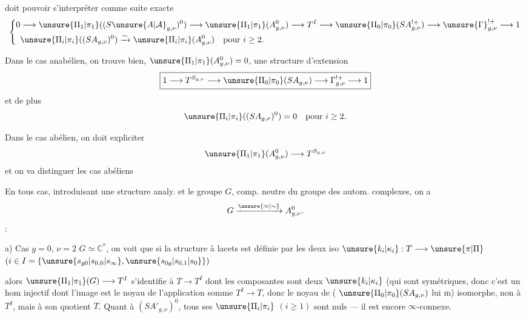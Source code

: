 

doit pouvoir s'interpréter comme suite exacte
\[
\left\{\begin{aligned}
0&\longrightarrow\unsure{\Pi_1|\pi_1}((S\unsure{A|\mathcal A}_{g,\nu})^0)
\longrightarrow\unsure{\Pi_1|\pi_1}(A_{g,\nu}^0)
\longrightarrow T^I\longrightarrow\unsure{\Pi_0|\pi_0}(SA_{g,\nu}^{!+})
\longrightarrow\unsure{\Gamma}_{g,\nu}^{!+}\longrightarrow1\\
&\unsure{\Pi_i|\pi_i}((SA_{g,\nu})^0)\xrightarrow{\sim}
\unsure{\Pi_i|\pi_i}(A_{g,\nu}^0)\quad\text{pour }i\geq2.
\end{aligned}\right.
\]

Dans le cas anabélien, on trouve bien, 
$\unsure{\Pi_1|\pi_1}(A_{g,\nu}^0)=0$, une structure d'extension
\[
\boxed{1\longrightarrow T^{S_{g,\nu}}\longrightarrow
\unsure{\Pi_0|\pi_0}(SA_{g,\nu})\longrightarrow\Gamma_{g,\nu}^{!+}\longrightarrow1}
\]
et de plus
\[
\unsure{\Pi_i|\pi_i}((SA_{g,\nu})^0)=0\quad\text{pour }i\geq2.
\]

Dans le cas abélien, on doit expliciter
\[
\unsure{\Pi_1|\pi_1}(A_{g,\nu}^0)\longrightarrow T^{S_{g,\nu}}
\]
et on va distinguer les  cas abéliens

En tous cas, introduisant une structure analy.  et le groupe $G$, comp. neutre du groupe des autom. complexes, on a
\[
G\xrightarrow{\unsure{\approx|\sim}}A_{g,\nu}^0.
\]
 :

a) Cas $g=0$, $\nu=2$ 
$G\simeq\mathbb C^*$, 
on voit que si la structure à lacets  est définie par les deux iso
$\unsure{k_i|\kappa_i}:T\longrightarrow\unsure{\pi|\Pi}$
$(i\in I=\{\unsure{s_{g0}|s_{0,0}|s_\infty},\unsure{s_{0g}|s_{0,1}|s_0}\})$



alors $\unsure{\Pi_1|\pi_1}(G)\longrightarrow T^I$ s'identifie à
$T\longrightarrow T^I$ dont les composantes sont  deux
$\unsure{k_i|\kappa_i}$ (qui sont symétriques, donc c'est un hom injectif dont l'image est le noyau de l'application somme
$T^I\longrightarrow T$, donc  le noyau de
( $\unsure{\Pi_0|\pi_0}(SA_{g,\nu})$ lui $\overline{\mathrm m}$)
 isomorphe, non à $T^I$, mais à son quotient $T$.
Quant à $(SA'_{g,\nu})^0$, tous ses $\unsure{\Pi_i|\pi_i}$ $(i\geq1)$ sont nuls --- il est encore $\infty$-connexe.

